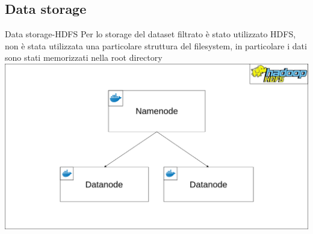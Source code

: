 \documentclass[13pt,aspectratio=169,t,xcolor=table]{beamer}
\begin{document}
\subsection{Data storage}
\begin{frame}{Data storage-HDFS}
    Per lo storage del dataset filtrato è stato utilizzato HDFS, non è stata utilizzata una particolare struttura del filesystem, in particolare i dati sono stati memorizzati nella root directory
    \begin{adjustbox}{margin=0cm 0cm 0cm 0.7cm, center} %
        \includegraphics[width=.6\textwidth]{res/hdfs_cluster.png}
    \end{adjustbox}
\end{frame}
\end{document}
